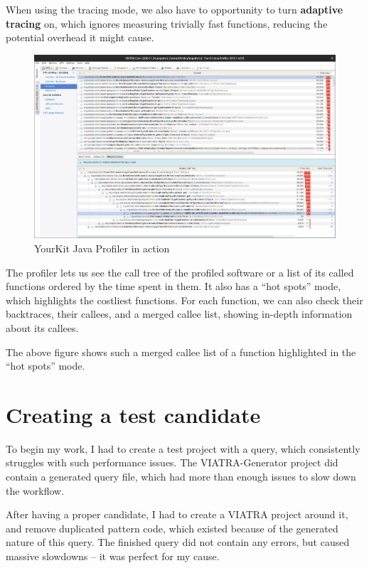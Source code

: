 \documentclass[11pt,a4paper,oneside]{report}
\begin{document}
When using the tracing mode, we also have to opportunity to turn
\textbf{adaptive tracing} on, which ignores measuring trivially fast functions,
reducing the potential overhead it might cause.

\begin{figure}[ht]
\centering
\includegraphics[width=150mm, keepaspectratio]{figures/yourkit-profiler.png}
\caption{YourKit Java Profiler in action}
\label{fig:yourkit-profiler}
\end{figure}

The profiler lets us see the call tree of the profiled software or a list of its
called functions ordered by the time spent in them. It also has a ``hot spots''
mode, which highlights the costliest functions. For each function, we can also
check their backtraces, their callees, and a merged callee list, showing
in-depth information about its callees.

The above figure shows such a merged callee list of a function highlighted in
the ``hot spots'' mode.

\section{Creating a test candidate}
To begin my work, I had to create a test project with a query, which
consistently struggles with such performance issues. The VIATRA-Generator
project\cite{github-viatra-generator} did contain a generated query file, which
had more than enough issues to slow down the workflow.

After having a proper candidate, I had to create a VIATRA
project\cite{github-viatra-vql-slowdown-example} around it, and
remove duplicated pattern code, which existed because of the generated nature
of this query. The finished query did not contain any errors, but caused massive
slowdowns -- it was perfect for my cause.
\end{document}
